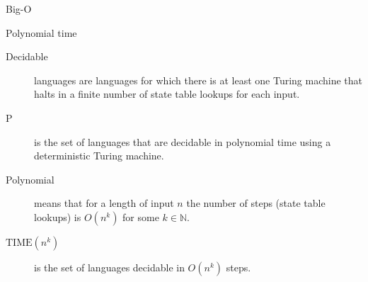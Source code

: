 \documentclass{beamer}
\begin{document}
\begin{frame}[fragile]{Big-O}
  \begin{center}
  \end{center}
\end{frame}


\begin{frame}{Polynomial time}
  
  
  \begin{description}
    \item[Decidable] languages are languages for which there is at least one Turing machine that halts in a finite number of state table lookups for each input.
    \item[P] is the set of languages that are decidable in polynomial time using a deterministic Turing machine.
    \item[Polynomial] means that for a length of input \( n \) the number of steps (state table lookups) is \( O(n^k) \) for some \( k \in \mathbb{N} \).
    \item[\( \text{TIME}(n^k) \)] is the set of languages decidable in \( O(n^k) \) steps.
  \end{description}

\end{frame}
\end{document}
